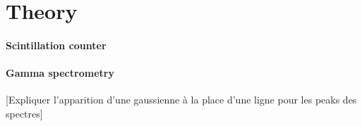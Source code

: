 \section{Theory}

\paragraph{Scintillation counter}

\paragraph{Gamma spectrometry}
[Expliquer l'apparition d'une gaussienne à la place d'une ligne pour les peaks des spectres]
